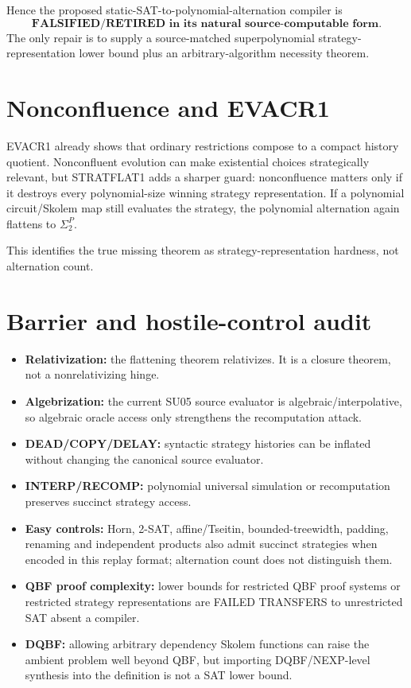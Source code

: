 \documentclass[11pt]{article}
\begin{document}
Hence the proposed static-SAT-to-polynomial-alternation compiler is
\[
\boxed{\textbf{FALSIFIED/RETIRED in its natural source-computable form}.}
\]
The only repair is to supply a source-matched superpolynomial strategy-representation lower bound plus an arbitrary-algorithm necessity theorem.

\section*{Nonconfluence and EVACR1}
EVACR1 already shows that ordinary restrictions compose to a compact history quotient. Nonconfluent evolution can make existential choices strategically relevant, but STRATFLAT1 adds a sharper guard: nonconfluence matters only if it destroys every polynomial-size winning strategy representation. If a polynomial circuit/Skolem map still evaluates the strategy, the polynomial alternation again flattens to \(\Sigma_2^P\).

This identifies the true missing theorem as strategy-representation hardness, not alternation count.

\section*{Barrier and hostile-control audit}
\begin{itemize}
\item \textbf{Relativization:} the flattening theorem relativizes. It is a closure theorem, not a nonrelativizing hinge.
\item \textbf{Algebrization:} the current SU05 source evaluator is algebraic/interpolative, so algebraic oracle access only strengthens the recomputation attack.
\item \textbf{DEAD/COPY/DELAY:} syntactic strategy histories can be inflated without changing the canonical source evaluator.
\item \textbf{INTERP/RECOMP:} polynomial universal simulation or recomputation preserves succinct strategy access.
\item \textbf{Easy controls:} Horn, 2-SAT, affine/Tseitin, bounded-treewidth, padding, renaming and independent products also admit succinct strategies when encoded in this replay format; alternation count does not distinguish them.
\item \textbf{QBF proof complexity:} lower bounds for restricted QBF proof systems or restricted strategy representations are FAILED TRANSFERS to unrestricted SAT absent a compiler.
\item \textbf{DQBF:} allowing arbitrary dependency Skolem functions can raise the ambient problem well beyond QBF, but importing DQBF/NEXP-level synthesis into the definition is not a SAT lower bound.
\end{itemize}
\end{document}
